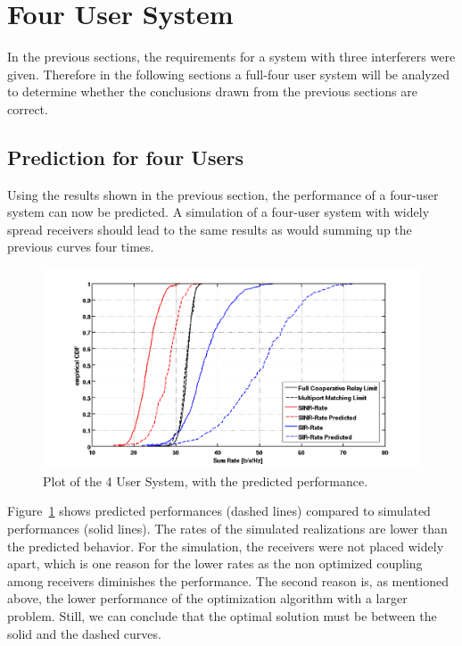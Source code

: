 \section{Four User System}
In the previous sections, the requirements for a system with three interferers were given.
Therefore in the following sections a full-four user system will be analyzed to determine whether the conclusions drawn from the previous sections are correct.

\subsection{Prediction for four Users}
\label{sec:const_prediction}

Using the results shown in the previous section, the performance of a four-user system can now be predicted.
A simulation of a four-user system with widely spread receivers should lead to the same results as would summing up the previous curves four times.
\begin{figure}[h]
\centering
  \includegraphics[width=\linewidth]{images/4user_inklpred.png}
\caption{Plot of the 4 User System, with the predicted performance.}
\label{fig:4user_pred}
\end{figure}

Figure~\ref{fig:4user_pred} shows predicted performances (dashed lines) compared to simulated performances (solid lines).
The rates of the simulated realizations are lower than the predicted behavior.
For the simulation, the receivers were not placed widely apart, which is one reason for the lower rates as the non optimized coupling among receivers diminishes the performance.
The second reason is, as mentioned above, the lower performance of the optimization algorithm with a larger problem.
Still, we can conclude that the optimal solution must be between the solid and the dashed curves.

